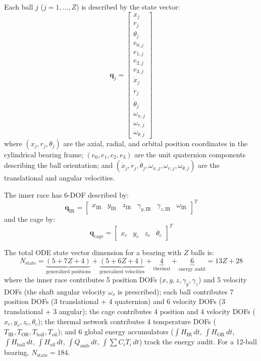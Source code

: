 \documentclass[preprint,12pt]{elsarticle}
\begin{document}
Each ball $j$ ($j = 1, \ldots, Z$) is described by the state vector:
\begin{equation}
    \bm{q}_j = \begin{bmatrix} x_j \\ r_j \\ \theta_j \\ e_{0,j} \\ e_{1,j} \\ e_{2,j} \\ e_{3,j} \\ \dot{x}_j \\ \dot{r}_j \\ \dot{\theta}_j \\ \omega_{x,j} \\ \omega_{r,j} \\ \omega_{\theta,j} \end{bmatrix}
    \label{eq:ball_state}
\end{equation}
where $(x_j, r_j, \theta_j)$ are the axial, radial, and orbital position coordinates in the cylindrical bearing frame; $(e_0, e_1, e_2, e_3)$ are the unit quaternion components describing the ball orientation; and $(\dot{x}_j, \dot{r}_j, \dot{\theta}_j, \omega_{x,j}, \omega_{r,j}, \omega_{\theta,j})$ are the translational and angular velocities.

The inner race has 6-DOF described by:
\begin{equation}
    \bm{q}_{\text{IR}} = \begin{bmatrix} x_{\text{IR}} & y_{\text{IR}} & z_{\text{IR}} & \gamma_{y,\text{IR}} & \gamma_{z,\text{IR}} & \omega_{\text{IR}} \end{bmatrix}^T
\end{equation}
and the cage by:
\begin{equation}
    \bm{q}_{\text{cage}} = \begin{bmatrix} x_c & y_c & z_c & \dot{\theta}_c \end{bmatrix}^T
\end{equation}

The total ODE state vector dimension for a bearing with $Z$ balls is:
\begin{equation}
    N_{\text{state}} = \underbrace{(5 + 7Z + 4)}_{\text{generalized positions}} + \underbrace{(5 + 6Z + 4)}_{\text{generalized velocities}} + \underbrace{4}_{\text{thermal}} + \underbrace{6}_{\text{energy audit}} = 13Z + 28
    \label{eq:ndof}
\end{equation}
where the inner race contributes 5 position DOFs ($x, y, z, \gamma_y, \gamma_z$) and 5 velocity DOFs (the shaft angular velocity $\omega_s$ is prescribed); each ball contributes 7 position DOFs (3 translational + 4 quaternion) and 6 velocity DOFs (3 translational + 3 angular); the cage contributes 4 position and 4 velocity DOFs ($x_c, y_c, z_c, \theta_c$); the thermal network contributes 4 temperature DOFs ($T_{\text{IR}}, T_{\text{OR}}, T_{\text{ball}}, T_{\text{oil}}$); and 6 global energy accumulators ($\int H_{\text{IR}}\,dt$, $\int H_{\text{OR}}\,dt$, $\int H_{\text{ball}}\,dt$, $\int H_{\text{oil}}\,dt$, $\int Q_{\text{amb}}\,dt$, $\int \sum C_i \dot{T}_i\,dt$) track the energy audit. For a 12-ball bearing, $N_{\text{state}} = 184$.
\end{document}
